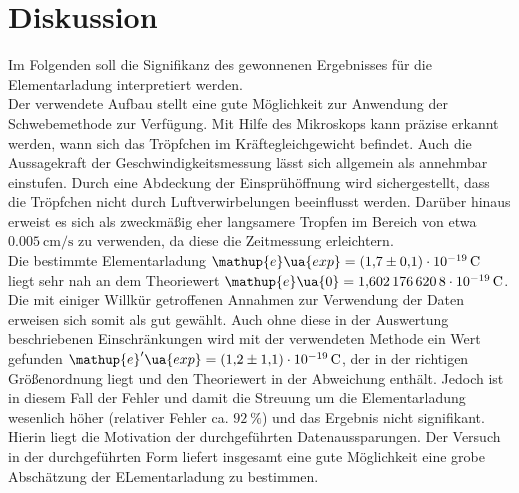 \newpage \section{Diskussion}
Im Folgenden soll die Signifikanz des gewonnenen Ergebnisses für die Elementarladung interpretiert werden. \\
Der verwendete Aufbau stellt eine gute Möglichkeit zur Anwendung der Schwebemethode zur Verfügung. Mit Hilfe des Mikroskops
kann präzise erkannt werden, wann sich das Tröpfchen im Kräftegleichgewicht befindet. Auch die Aussagekraft der Geschwindigkeitsmessung lässt
sich allgemein als annehmbar einstufen. Durch eine Abdeckung der Einsprühöffnung wird sichergestellt, dass die
Tröpfchen nicht durch Luftverwirbelungen beeinflusst werden. Darüber hinaus erweist es sich als zweckmäßig eher langsamere Tropfen
im Bereich von etwa $\SI{0.005}{\centi\meter \per \second}$ zu verwenden, da diese die Zeitmessung erleichtern. \\
Die bestimmte Elementarladung $\mathup{e}\ua{exp} = \SI{+1.7(1)e-19}{\coulomb}$ liegt sehr nah an dem Theoriewert
$\mathup{e}\ua{0} = \SI{1.6021766208e-19}{\coulomb}$. Die mit einiger Willkür getroffenen Annahmen zur Verwendung der Daten erweisen sich
somit als gut gewählt. Auch ohne diese in der Auswertung beschriebenen Einschränkungen wird mit der verwendeten Methode ein Wert gefunden
$\mathup{e}'\ua{exp} = \SI{+1.2(11)e-19}{\coulomb}$, der in der richtigen Größenordnung liegt und den Theoriewert in der Abweichung enthält. Jedoch ist in
diesem Fall der Fehler und damit die Streuung um die Elementarladung wesenlich höher (relativer Fehler ca. $\SI{92}{\percent}$) und das Ergebnis %
nicht signifikant. Hierin liegt die Motivation der durchgeführten Datenaussparungen. %
Der Versuch in der durchgeführten Form liefert insgesamt eine gute Möglichkeit eine grobe Abschätzung der ELementarladung zu bestimmen.

